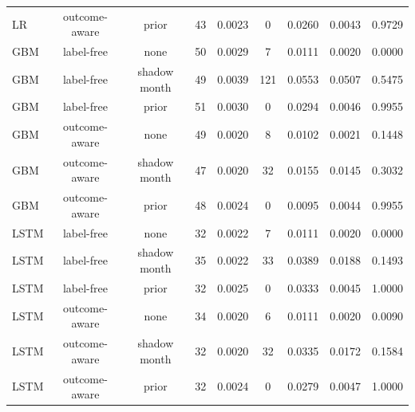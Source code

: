 \documentclass[10pt,onecolumn,letterpaper]{article}
\begin{document}
\begin{table}[!t]
{\begin{tabular}{lcccccccc}
LR & outcome-aware & prior & 43 & 0.0023 & 0 & 0.0260 & 0.0043 & 0.9729 \\
GBM & label-free & none & 50 & 0.0029 & 7 & 0.0111 & 0.0020 & 0.0000 \\
GBM & label-free & shadow month & 49 & 0.0039 & 121 & 0.0553 & 0.0507 & 0.5475 \\
GBM & label-free & prior & 51 & 0.0030 & 0 & 0.0294 & 0.0046 & 0.9955 \\
GBM & outcome-aware & none & 49 & 0.0020 & 8 & 0.0102 & 0.0021 & 0.1448 \\
GBM & outcome-aware & shadow month & 47 & 0.0020 & 32 & 0.0155 & 0.0145 & 0.3032 \\
GBM & outcome-aware & prior & 48 & 0.0024 & 0 & 0.0095 & 0.0044 & 0.9955 \\
LSTM & label-free & none & 32 & 0.0022 & 7 & 0.0111 & 0.0020 & 0.0000 \\
LSTM & label-free & shadow month & 35 & 0.0022 & 33 & 0.0389 & 0.0188 & 0.1493 \\
LSTM & label-free & prior & 32 & 0.0025 & 0 & 0.0333 & 0.0045 & 1.0000 \\
LSTM & outcome-aware & none & 34 & 0.0020 & 6 & 0.0111 & 0.0020 & 0.0090 \\
LSTM & outcome-aware & shadow month & 32 & 0.0020 & 32 & 0.0335 & 0.0172 & 0.1584 \\
LSTM & outcome-aware & prior & 32 & 0.0024 & 0 & 0.0279 & 0.0047 & 1.0000 \\
\bottomrule
\end{tabular}}
\end{table}
\end{document}
